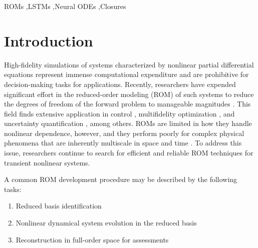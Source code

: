 \documentclass[preprint,12pt]{elsarticle}
\begin{document}
\begin{frontmatter}
\begin{abstract}
\end{abstract}

\begin{keyword}
ROMs \sep LSTMs \sep Neural ODEs \sep Closures 
\end{keyword}

\end{frontmatter}


\section{Introduction}
\label{Intro}

High-fidelity simulations of systems characterized by nonlinear partial differential equations represent immense computational expenditure and are prohibitive for decision-making tasks for applications. Recently,  researchers have expended  significant effort in the reduced-order modeling (ROM) of such systems to reduce the degrees of freedom of the forward problem to manageable magnitudes \cite{carlberg2011efficient,wang2012proper,san2015principal,ballarin2015supremizer,san2018extreme,wang2019non,choi2019space,maulik2019using}. This field finds extensive application in control \cite{proctor2016dynamic}, multifidelity optimization \cite{peherstorfer2016optimal}, and uncertainty quantification \cite{sapsis2013statistically,zahr2018efficient}, among others.  ROMs are limited in how they handle nonlinear dependence, however, and they perform poorly for complex physical phenomena that are inherently multiscale in space and time \cite{wells2017evolve,xie2018data,san2018neural,san2019artificial}. To address this issue, researchers continue to search for efficient and reliable ROM techniques for transient nonlinear systems. 

A common ROM development procedure may be described by the following tasks:
\begin{enumerate}
    \item Reduced basis identification
    \item Nonlinear dynamical system evolution in the reduced basis
    \item Reconstruction in full-order space for assessments
\end{enumerate}
\end{document}
